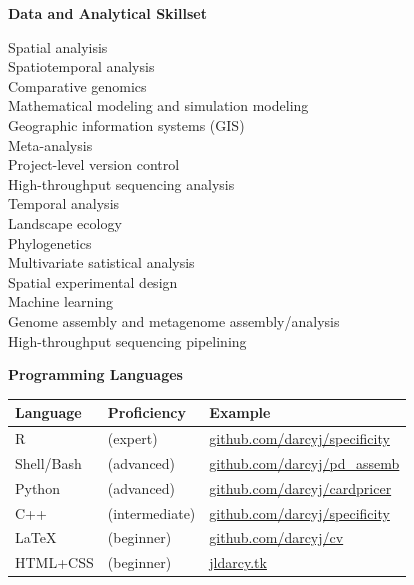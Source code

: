 \documentclass{article}
\begin{document}
{\large  \textbf{Data and Analytical Skillset}}
  \begin{adjustwidth}{2mm}{}\begin{multicols}{2}
    Spatial analyisis \cite{Darcy2018a,Darcy2011a,Darcy640029}\\
    Spatiotemporal analysis \cite{Darcy640029,Darcy2017,Nemergut2016}\\
    Comparative genomics \cite{Darcy2018,Lynch2014}\\
    Mathematical modeling and simulation modeling \cite{Darcy685644,Darcy640029, Darcy2016}\\
    Geographic information systems (GIS) \cite{Darcy640029,Darcy2018a,Darcy2017}\\
    Meta-analysis \cite{Darcy685644,Darcy2018a,Darcy2011a}\\
    Project-level version control \cite[\href{https://github.com/darcyj/specificity}{specificity} R package]{Darcy2018}\\
    High-throughput sequencing analysis \cite{Darcy685644,Darcy640029,Darcy2018a}\\

    Temporal analysis \cite{Darcy685644,Knelman2014,Kennedy2016}\\
    Landscape ecology \cite{Darcy640029,Darcy2018,Darcy2017}\\
    Phylogenetics \cite{Darcy2011a,Schmidt2015a,Naff2013}\\
    Multivariate satistical analysis \cite{Darcy640029,Darcy2017,Gendron2019}\\
    Spatial experimental design \cite{Darcy2018a,Darcy2017,Darcy2018}\\
    Machine learning \cite{Darcy2021,Amend2022}\\
    Genome assembly and metagenome assembly/analysis \cite{Darcy2018,Lynch2014}\\
    High-throughput sequencing pipelining \cite{Darcy685644,Darcy640029,Darcy2018a}

  \end{multicols}\end{adjustwidth}

{\large  \textbf{Programming Languages}}
\\\begin{tabular}{l l l}
  Language & Proficiency & Example\\
  \hline
  R & (expert) & \href{https://github.com/darcyj/specificity}{github.com/darcyj/specificity}\\
  Shell/Bash & (advanced) & \href{https://github.com/darcyj/pd_assemb}{github.com/darcyj/pd\_assemb}\\
  Python & (advanced) & \href{https://github.com/darcyj/cardpricer}{github.com/darcyj/cardpricer}\\
  C++ & (intermediate) & \href{https://github.com/darcyj/specificity}{github.com/darcyj/specificity}\\ 
  \LaTeX & (beginner) & \href{https://github.com/darcyj/cv}{github.com/darcyj/cv}\\
  HTML+CSS & (beginner) & \href{jldarcy.tk}{jldarcy.tk}\\
\end{tabular}
\end{document}
